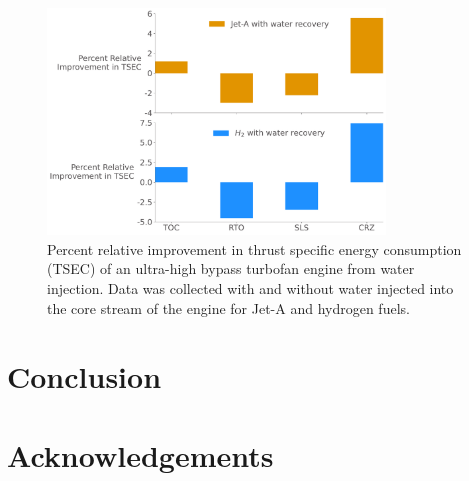 \documentclass[conf]{new-aiaa}
\begin{document}
\begin{figure}[hbt!]
  \centering
  \includegraphics[width=0.8\textwidth]{JetA-H2_TSEC_diff.pdf}
  \caption{Percent relative improvement in thrust specific energy consumption (TSEC) of an ultra-high bypass turbofan engine from water injection.
    Data was collected with and without water injected into the core stream of the engine for Jet-A and hydrogen fuels.}
  \label{fig:barchart}
\end{figure}


\section{Conclusion}
\label{sec:conc}

\section{Acknowledgements}


\end{document}
